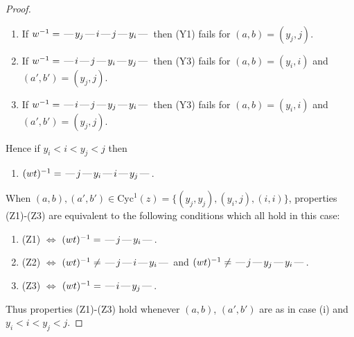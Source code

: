 \documentclass[10pt]{article}
\theoremstyle{definition}
\theoremstyle{definition}
\def\dash{\text{\hspace{0.5mm}---\hspace{0.5mm}}}
\def\Cyc{\mathrm{Cyc}}
\begin{document}
\begin{proof}
\begin{enumerate}
\item If $w^{-1} = \dash y_j\dash i\dash j\dash y_i\dash $ then (Y1) fails for $(a,b)=(y_j,j)$.
\item If $w^{-1} = \dash i\dash j\dash y_i\dash y_j\dash $ then (Y3) fails for $(a,b)=(y_i,i)$ and $(a',b')=(y_j,j)$.
\item If $w^{-1} = \dash i\dash j\dash y_j\dash y_i\dash $ then (Y3) fails for $(a,b)=(y_i,i)$ and $(a',b')=(y_j,j)$.
\end{enumerate}
Hence if $y_i < i < y_j < j$ then \begin{enumerate}\item[] $(wt)^{-1} = \dash j\dash y_i\dash i\dash y_j\dash $. \end{enumerate}
When $(a,b),(a',b')\in\Cyc^1(z)= \{(y_j,y_j),(y_i,j),(i,i)\}$,
properties (Z1)-(Z3) are equivalent to the following conditions which all hold in this case:
\begin{enumerate}
\item[](Z1) $\Leftrightarrow$ $(wt)^{-1} = \dash j \dash y_i \dash$.
\item[](Z2) $\Leftrightarrow$ $(wt)^{-1} \neq \dash j \dash i \dash y_i \dash$  and $(wt)^{-1} \neq \dash j \dash y_j \dash y_i \dash$.
\item[](Z3) $\Leftrightarrow$ $(wt)^{-1} = \dash i \dash y_j \dash$.
\end{enumerate}
Thus properties (Z1)-(Z3) hold whenever $(a,b)$, $(a',b')$ are as in case (i) and $y_i < i < y_j < j$.

\end{proof}
\end{document}
